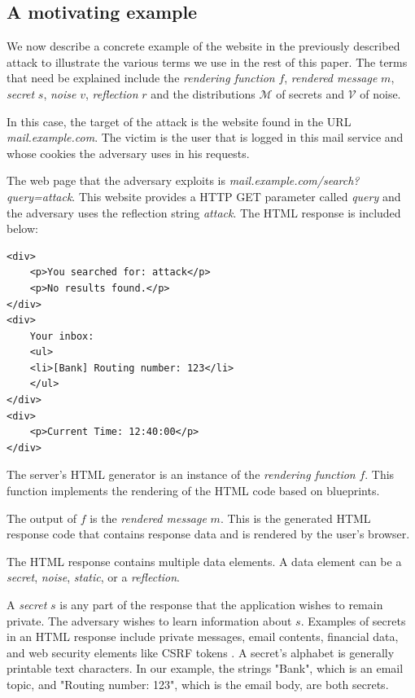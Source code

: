 \documentclass[conference, letterpaper, 10pt]{IEEEtran}
\begin{document}
\subsection{A motivating example}\label{subsec:terms}
We now describe a concrete example of the website in the previously described
attack to illustrate the various terms we use in the rest of this paper.  The
terms that need be explained include the \textit{rendering function} $f$,
\textit{rendered message} $m$, \textit{secret} $s$, \textit{noise} $v$,
\textit{reflection} $r$ and the distributions $\mathcal{M}$ of secrets and
$\mathcal{V}$ of noise.

In this case, the target of the attack is the website found in the URL
\textit{mail.example.com}. The victim is the user that is logged in this mail
service and whose cookies the adversary uses in his requests.

The web page that the adversary exploits is
\textit{mail.example.com/search?query=attack}. This website provides a HTTP GET
parameter called \textit{query} and the adversary uses the reflection string
\textit{attack}. The HTML response is included below:

\begin{lstlisting}[basicstyle=\small\ttfamily]
<div>
    <p>You searched for: attack</p>
    <p>No results found.</p>
</div>
<div>
    Your inbox:
    <ul>
    <li>[Bank] Routing number: 123</li>
    </ul>
</div>
<div>
    <p>Current Time: 12:40:00</p>
</div>
\end{lstlisting}

The server's HTML generator is an instance of the \textit{rendering function}
$f$. This function implements the rendering of the HTML code based on
blueprints.

The output of $f$ is the \textit{rendered message} $m$. This is the generated
HTML response code that contains response data and is rendered by the user's
browser.

The HTML response contains multiple data elements. A data element can be a
\textit{secret}, \textit{noise}, \textit{static}, or a \textit{reflection}.

A \textit{secret} $s$ is any part of the response that the application wishes to
remain private. The adversary wishes to learn information about $s$. Examples of
secrets in an HTML response include private messages, email contents, financial
data, and web security elements like CSRF tokens \cite{c5}. A secret's alphabet
is generally printable text characters. In our example, the strings "Bank",
which is an email topic, and "Routing number: 123", which is the email body, are
both secrets.
\end{document}
